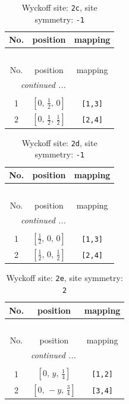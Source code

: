 \documentclass[fleqn,8pt]{jsarticle}
\begin{document}
\renewcommand{\arraystretch}{1.2}
\begin{longtable}{ccc}
\caption{Wyckoff site: {\tt 2c}, site symmetry: {\tt -1}}
 \\
 \hline \hline
No. & position & mapping \\ \hline \endfirsthead

\multicolumn{2}{l}{\tablename\ \thetable{}} \\
 \hline \hline
No. & position & mapping \\ \hline \endhead

 \hline \hline
\multicolumn{2}{r}{\footnotesize\it continued ...} \\ \endfoot

 \hline \hline
\multicolumn{2}{r}{} \\ \endlastfoot

1 & $\left[ 0,\, \frac{1}{2},\, 0 \right]$ & {\tt [1,3]} \\ \hline
2 & $\left[ 0,\, \frac{1}{2},\, \frac{1}{2} \right]$ & {\tt [2,4]} \\
\end{longtable}
\renewcommand{\arraystretch}{1.2}
\begin{longtable}{ccc}
\caption{Wyckoff site: {\tt 2d}, site symmetry: {\tt -1}}
 \\
 \hline \hline
No. & position & mapping \\ \hline \endfirsthead

\multicolumn{2}{l}{\tablename\ \thetable{}} \\
 \hline \hline
No. & position & mapping \\ \hline \endhead

 \hline \hline
\multicolumn{2}{r}{\footnotesize\it continued ...} \\ \endfoot

 \hline \hline
\multicolumn{2}{r}{} \\ \endlastfoot

1 & $\left[ \frac{1}{2},\, 0,\, 0 \right]$ & {\tt [1,3]} \\ \hline
2 & $\left[ \frac{1}{2},\, 0,\, \frac{1}{2} \right]$ & {\tt [2,4]} \\
\end{longtable}
\renewcommand{\arraystretch}{1.2}
\begin{longtable}{ccc}
\caption{Wyckoff site: {\tt 2e}, site symmetry: {\tt 2}}
 \\
 \hline \hline
No. & position & mapping \\ \hline \endfirsthead

\multicolumn{2}{l}{\tablename\ \thetable{}} \\
 \hline \hline
No. & position & mapping \\ \hline \endhead

 \hline \hline
\multicolumn{2}{r}{\footnotesize\it continued ...} \\ \endfoot

 \hline \hline
\multicolumn{2}{r}{} \\ \endlastfoot

1 & $\left[ 0,\, y,\, \frac{1}{4} \right]$ & {\tt [1,2]} \\ \hline
2 & $\left[ 0,\, - y,\, \frac{3}{4} \right]$ & {\tt [3,4]} \\
\end{longtable}
\end{document}
